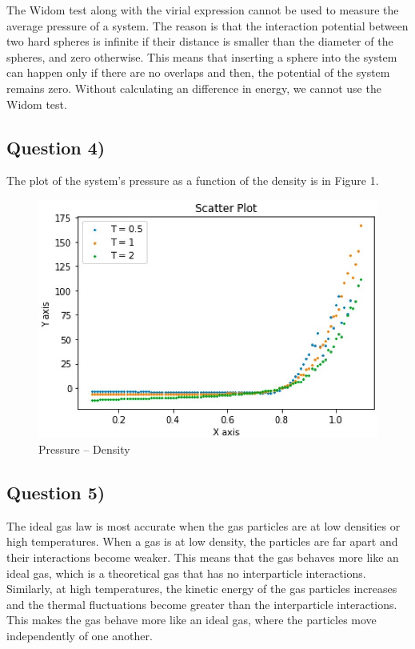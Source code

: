 \documentclass[11pt]{report}
\begin{document}
The Widom test along with the virial expression cannot be used to measure the average pressure of a system. The reason is that the interaction potential between two hard spheres is infinite if their distance is smaller than the diameter of the spheres, and zero otherwise. This means that inserting a sphere into the system can happen only if there are no overlaps and then, the potential of the system remains zero. Without calculating an difference in energy, we cannot use the Widom test.


\subsection*{Question 4)}

The plot of the system's pressure as a function of the density is in Figure 1.

\begin{figure}[ht!]
\begin{center}
	\includegraphics[scale = 0.4]{P.jpeg}
	\caption{Pressure -- Density}
\end{center}	
\end{figure}



\subsection*{Question 5)}

The ideal gas law is most accurate when the gas particles are at low densities or high temperatures. When a gas is at low density, the particles are far apart and their interactions become weaker. This means that the gas behaves more like an ideal gas, which is a theoretical gas that has no interparticle interactions. Similarly, at high temperatures, the kinetic energy of the gas particles increases and the thermal fluctuations become greater than the interparticle interactions. This makes the gas behave more like an ideal gas, where the particles move independently of one another. 
\end{document}
